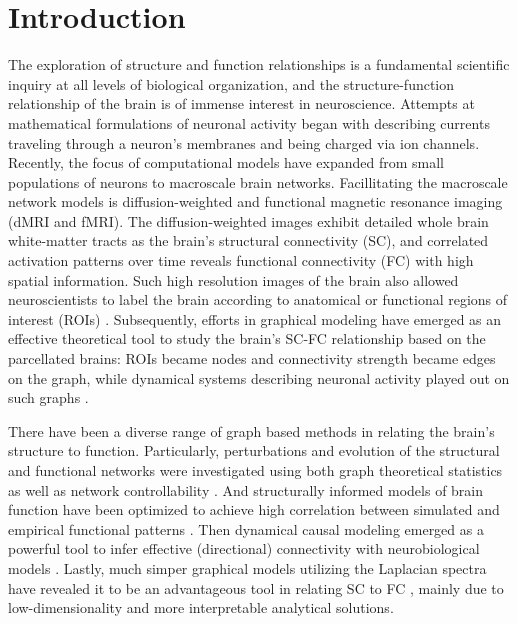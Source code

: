 \documentclass{article}
\begin{document}
\section{Introduction}
The exploration of structure and function relationships is a fundamental scientific inquiry at all levels of biological organization, and the structure-function relationship of the brain is of immense interest in neuroscience. Attempts at mathematical formulations of neuronal activity began with describing currents traveling through a neuron's membranes and being charged via ion channels\cite{hodgkin_quantitative_1952}. Recently, the focus of computational models have expanded from small populations of neurons to macroscale brain networks. Facillitating the macroscale network models is diffusion-weighted and functional magnetic resonance imaging (dMRI and fMRI). The diffusion-weighted images exhibit detailed whole brain white-matter tracts as the brain's structural connectivity (SC), and correlated activation patterns over time reveals functional connectivity (FC) with high spatial information. Such high resolution images of the brain also allowed neuroscientists to label the brain according to anatomical or functional regions of interest (ROIs) \cite{Desikan2006, craddock_whole_2012}. Subsequently, efforts in graphical modeling have emerged as an effective theoretical tool to study the brain's SC-FC relationship based on the parcellated brains: ROIs became nodes and connectivity strength became edges on the graph, while dynamical systems describing neuronal activity played out on such graphs \cite{bassett_human_2009,bullmore_complex_2009,cao_topological_2014}. 

There have been a diverse range of graph based methods in relating the brain's structure to function. Particularly, perturbations and evolution of the structural and functional networks were investigated using both graph theoretical statistics \cite{Kuceyeski2016} as well as network controllability \cite{gu_controllability_2015, Muldoon2016}. And structurally informed models of brain function have been optimized to achieve high correlation between simulated and empirical functional patterns \cite{Honey2009}. Then dynamical causal modeling emerged as a powerful tool to infer effective (directional) connectivity with neurobiological models \cite{frassle_generative_2018}. Lastly, much simper graphical models utilizing the Laplacian spectra have revealed it to be an advantageous tool in relating SC to FC \cite{Abdelnour2018}, mainly due to low-dimensionality and more interpretable analytical solutions.
\end{document}
